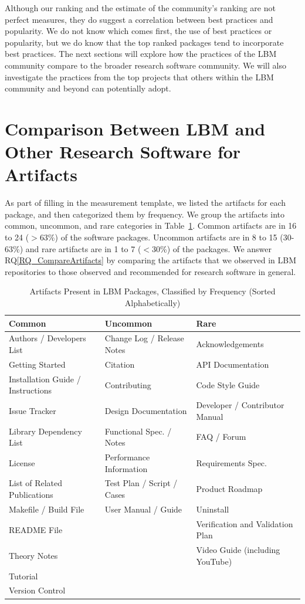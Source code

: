 \documentclass[final, 3p, times, authoryear]{elsarticle}
\newcommand{\rqref}[1]{RQ\ref{#1}}
\begin{document}
Although our ranking and the estimate of the community's ranking are not perfect
measures, they do suggest a correlation between best practices and popularity.
We do not know which comes first, the use of best practices or popularity, but
we do know that the top ranked packages tend to incorporate best practices.  The
next sections will explore how the practices of the LBM community compare to the
broader research software community.  We will also investigate the practices
from the top projects that others within the LBM community and beyond can
potentially adopt.

\section{Comparison Between LBM and Other Research Software for Artifacts}
\label{Sec_CompareArtifacts}

As part of filling in the measurement template, we listed the artifacts for each
package, and then categorized them by frequency. We group the artifacts into
common, uncommon, and rare categories in Table~\ref{artifactspresent}. Common
artifacts are in 16 to 24 ($>$63\%) of the software packages. Uncommon artifacts
are in 8 to 15 (30-63\%) and rare artifacts are in 1 to 7 ($<$30\%) of the
packages.  We answer \rqref{RQ_CompareArtifacts} by comparing the artifacts that
we observed in LBM repositories to those observed and recommended for research
software in general.

\begin{table}[ht!]
\begin{center}
\begin{tabular}{ p{5.3 cm} p{4.9 cm} p{5 cm}}
\toprule
\textbf{Common} & \textbf{Uncommon} & \textbf{Rare} \\
\midrule
Authors / Developers List & Change Log / Release Notes & Acknowledgements\\
Getting Started & Citation & API Documentation\\
Installation Guide / Instructions & Contributing & Code Style Guide\\
Issue Tracker & Design Documentation & Developer / Contributor Manual\\
Library Dependency List & Functional Spec. / Notes & FAQ / Forum\\
License & Performance Information & Requirements Spec.\\
List of Related Publications & Test Plan / Script / Cases & Product Roadmap\\
Makefile / Build File & User Manual / Guide & Uninstall\\
README File & & Verification and Validation Plan\\
Theory Notes & & Video Guide (including YouTube)\\
Tutorial & & \\
Version Control & & \\
\bottomrule
\end{tabular}
\caption{Artifacts Present in LBM Packages, Classified by Frequency (Sorted Alphabetically)}
\label{artifactspresent}
\end{center}
\end{table}
\end{document}
